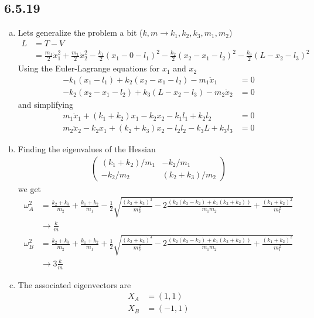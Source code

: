 \documentclass[../main.tex]{subfiles}
\begin{document}
\subsection{6.5.19}
\begin{enumerate}[(a)]
\item Lets generalize the problem a bit ($k,m \rightarrow k_1, k_2, k_3, m_1, m_2$)
\begin{align}
L&=T-V\\
&=
\frac{m_1}{2}\dot{x}_1^2
+\frac{m_1}{2}\dot{x}_2^2
-\frac{k_1}{2}(x_1-0-l_1)^2
-\frac{k_2}{2}(x_2-x_1-l_2)^2
-\frac{k_3}{2}(L-x_2-l_3)^2
\end{align}
Using the Euler-Lagrange equations for $x_1$ and $x_2$
\begin{align}
-k_1(x_1-l_1)+k_2(x_2-x_1-l_2)-m_1\ddot{x}_1&=0\\
-k_2(x_2-x_1-l_2)+k_3(L-x_2-l_3)-m_2\ddot{x}_2&=0
\end{align}
and simplifying
\begin{align}
m_1\ddot{x}_1+(k_1+k_2)x_1-k_2x_2-k_1l_1+k_2l_2&=0\\
m_2\ddot{x}_2-k_2x_1+(k_2+k_3)x_2-l_2l_2-k_3L+k_3l_3&=0
\end{align}
\item Finding the eigenvalues of the Hessian
\begin{align}
\left(\begin{array}{cc}
(k_1+k_2)/m_1 & -k_2/m_1\\
-k_2/m_2 & (k_2+k_3)/m_2
\end{array}\right)
\end{align}
we get
\begin{align}
\omega_A^2&=\frac{k_2+k_3}{m_2}+\frac{k_1+k_2}{m_1}-\frac{1}{2}\sqrt{\frac{(k_2+k_3)^3}{m_2^2}-2\frac{(k_2(k_3-k_2)+k_1(k_2+k_2))}{m_1m_2}+\frac{(k_1+k_2)^2}{m_1^2}}\\
&\rightarrow\frac{k}{m}\\
\omega_B^2&=\frac{k_2+k_3}{m_2}+\frac{k_1+k_2}{m_1}+\frac{1}{2}\sqrt{\frac{(k_2+k_3)^3}{m_2^2}-2\frac{(k_2(k_3-k_2)+k_1(k_2+k_2))}{m_1m_2}+\frac{(k_1+k_2)^2}{m_1^2}}\\
&\rightarrow3\frac{k}{m}
\end{align}

\item The associated eigenvectors are
\begin{align}
X_A&=(1,1)\\
X_B&=(-1,1)
\end{align}

\end{enumerate}
\end{document}
